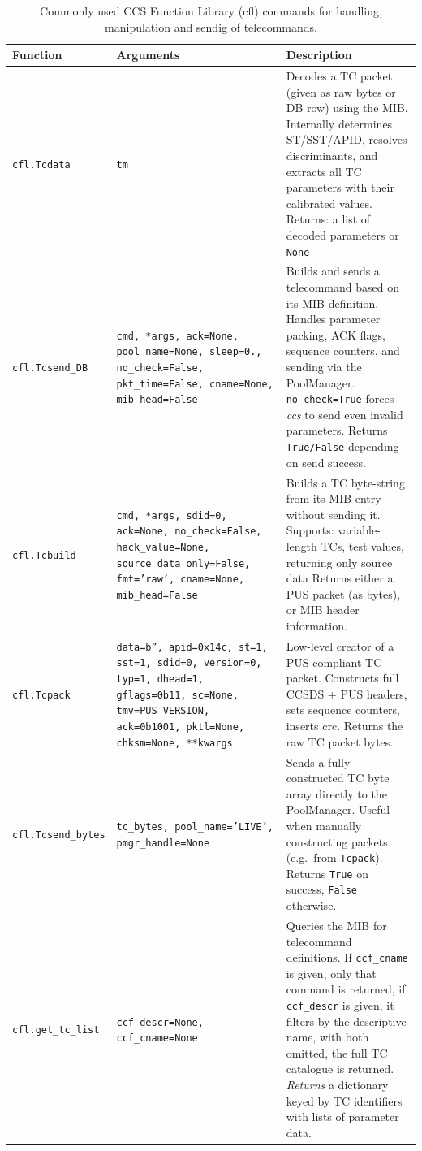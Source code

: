 \begin{table}[h!]
\centering
\renewcommand{\arraystretch}{1.3}
\setlength{\tabcolsep}{8pt}
\begin{tabular}{p{4cm} p{5cm} p{6cm}}
\hline
\textbf{Function} & \textbf{Arguments} & \textbf{Description} \\ 
\hline

\texttt{cfl.Tcdata} & \texttt{tm} &
Decodes a TC packet (given as raw bytes or DB row) using the MIB.  
Internally determines ST/SST/APID, resolves discriminants, and extracts all TC parameters with their calibrated values.  
Returns: a list of decoded parameters or \texttt{None} \\

\texttt{cfl.Tcsend\_DB} & \texttt{cmd, *args, ack=None, pool\_name=None, sleep=0., no\_check=False, pkt\_time=False, cname=None, mib\_head=False} &
Builds and sends a telecommand based on its MIB definition.  
Handles parameter packing, ACK flags, sequence counters, and sending via the PoolManager.  
\texttt{no\_check=True} forces \textit{ccs} to send even invalid parameters.  
Returns \texttt{True/False} depending on send success. \\

\texttt{cfl.Tcbuild} & \texttt{cmd, *args, sdid=0, ack=None, no\_check=False, hack\_value=None, source\_data\_only=False, fmt='raw', cname=None, mib\_head=False} &
Builds a TC byte-string from its MIB entry without sending it.  
Supports: variable-length TCs, test values, returning only source data
Returns either a PUS packet (as bytes), or MIB header information. \\

\texttt{cfl.Tcpack} & \texttt{data=b'', apid=0x14c, st=1, sst=1, sdid=0, version=0, typ=1, dhead=1, gflags=0b11, sc=None, tmv=PUS\_VERSION, ack=0b1001, pktl=None, chksm=None, **kwargs} &
Low-level creator of a PUS-compliant TC packet.  
Constructs full CCSDS + PUS headers, sets sequence counters, inserts crc.  
Returns the raw TC packet bytes. \\

\texttt{cfl.Tcsend\_bytes} & \texttt{tc\_bytes, pool\_name='LIVE', pmgr\_handle=None} &
Sends a fully constructed TC byte array directly to the PoolManager.  
Useful when manually constructing packets (e.g.\ from \texttt{Tcpack}).  
Returns \texttt{True} on success, \texttt{False} otherwise. \\

\texttt{cfl.get\_tc\_list} & \texttt{ccf\_descr=None, ccf\_cname=None} &
Queries the MIB for telecommand definitions.  
If \texttt{ccf\_cname} is given, only that command is returned,  
if \texttt{ccf\_descr} is given, it filters by the descriptive name,  
with both omitted, the full TC catalogue is returned.  
\emph{Returns} a dictionary keyed by TC identifiers with lists of parameter data. \\


\hline
\end{tabular}
\caption{Commonly used CCS Function Library (cfl) commands for handling, manipulation and sendig of telecommands.}
\end{table}


